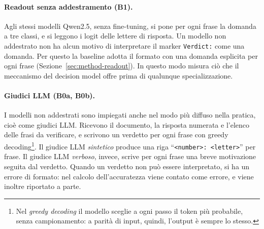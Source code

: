 \paragraph{Readout senza addestramento (B1).} Agli stessi modelli Qwen2.5, senza fine-tuning, si pone per ogni frase la
domanda a tre classi, e si leggono i logit delle lettere di risposta. Un modello non addestrato non ha alcun motivo di
interpretare il marker \texttt{Verdict:} come una domanda. Per questo la baseline adotta il formato con una domanda
esplicita per ogni frase (Sezione~\ref{sec:method-readout}). In questo modo misura ciò che il meccanismo del decision model offre
prima di qualunque specializzazione.

\paragraph{Giudici LLM (B0a, B0b).} I modelli non addestrati sono impiegati anche nel modo più diffuso nella
pratica, cioè come giudici LLM. Ricevono il documento, la risposta numerata e l'elenco delle frasi da verificare, e scrivono
un verdetto per ogni frase con greedy decoding\footnote{Nel \emph{greedy decoding} il modello sceglie a ogni passo il
token più probabile, senza campionamento: a parità di input, quindi, l'output è sempre lo stesso.}. Il giudice LLM
\emph{sintetico} produce una riga ``\texttt{<number>: <letter>}'' per frase. Il giudice LLM \emph{verboso}, invece, scrive per ogni frase una breve motivazione seguita dal verdetto. Quando un verdetto non può essere interpretato, si ha un
errore di formato: nel calcolo dell'accuratezza viene contato come errore, e viene inoltre riportato a parte.

